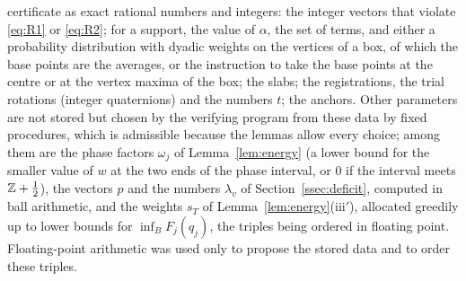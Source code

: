 \begin{itemize}
certificate as exact rational numbers and integers: the integer vectors that violate \eqref{eq:R1} or \eqref{eq:R2}; for a
support, the value of $\alpha$, the set of terms, and either a probability distribution with dyadic weights on the vertices of a
box, of which the base points are the averages, or the instruction to take the base points at the centre or at the
vertex maxima of the box; the slabs; the registrations, the trial rotations (integer quaternions) and the numbers $t$;
the anchors. Other parameters are not stored but chosen by the verifying program from these data by fixed procedures,
which is admissible because the lemmas allow every choice; among them are the phase factors $\omega_j$ of
Lemma~\ref{lem:energy} (a lower bound for the smaller value of $w$ at the two ends of the phase interval, or $0$ if the interval
meets $\mathbb Z+\frac12$), the vectors $p$ and the numbers $\lambda_v$ of Section~\ref{ssec:deficit}, computed in ball arithmetic,
and the weights $s_T$ of Lemma~\ref{lem:energy}(iii$'$), allocated greedily up to lower bounds for $\inf_BF_j(q_j)$, the
triples being ordered in floating point. Floating-point arithmetic was used only to propose the stored data and to order these
triples.
\end{itemize}

